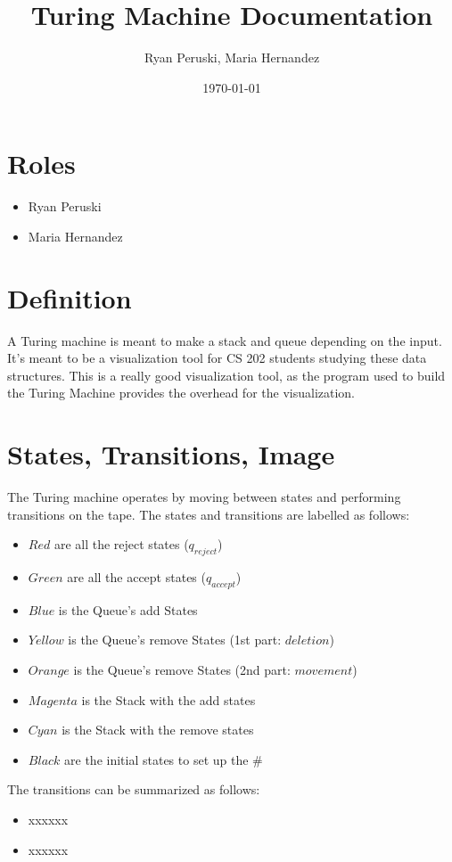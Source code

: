 \documentclass{article}
\title{Turing Machine Documentation}
\author{Ryan Peruski, Maria Hernandez}
\date{\today}
\begin{document}
\maketitle
\section{Roles}

\begin{itemize}
    \item Ryan Peruski
    \item Maria Hernandez
\end{itemize}
\section{Definition}
A Turing machine is meant to make a stack and queue depending on the input. It's meant to be a visualization tool for CS 202 students
studying these data structures. This is a really good visualization tool, as the program used to build the Turing Machine provides the overhead for
the visualization.

\section{States, Transitions, Image}
The Turing machine operates by moving between states and performing transitions on the tape. The states and transitions are labelled as follows:

\begin{itemize}
    \item $Red$ are all the reject states ($q_{reject}$)
    \item $Green$ are all the accept states ($q_{accept}$)
    \item $Blue$ is the Queue's add States
    \item $Yellow$ is the Queue's remove States (1st part: $deletion$)
    \item $Orange$ is the Queue's remove States  (2nd part: $movement$)
    \item $Magenta$ is the Stack with the add states
    \item $Cyan$ is the Stack with the remove states
    \item $Black$ are the initial states to set up the $\#$
\end{itemize}

The transitions can be summarized as follows:
\begin{itemize}
    \item xxxxxx
    \item xxxxxx
\end{itemize}
\end{document}
